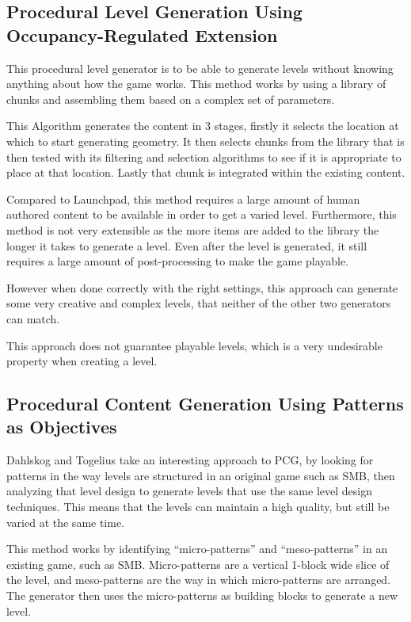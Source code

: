 \documentclass{scrartcl}
\begin{document}
\subsection{Procedural Level Generation Using Occupancy-Regulated Extension}

This procedural level generator is to be able to generate levels without knowing anything about how the game works. This method works by using a library of chunks and assembling them based on a complex set of parameters. 

This Algorithm generates the content in 3 stages, firstly it selects the location at which to start generating geometry. It then selects chunks from the library that is then tested with its filtering and selection algorithms to see if it is appropriate to place at that location. Lastly that chunk is integrated within the existing content.

Compared to Launchpad, this method requires a large amount of human authored content to be available in order to get a varied level. Furthermore, this method is not very extensible as the more items are added to the library the longer it takes to generate a level. Even after the level is generated, it still requires a large amount of post-processing to make the game playable.

However when done correctly with the right settings, this approach can generate some very creative and complex levels, that neither of the other two generators can match.

This approach does not guarantee playable levels, which is a very undesirable property when creating a level.



\subsection{Procedural Content Generation Using Patterns as Objectives}

Dahlskog and Togelius take an interesting approach to PCG, by looking for patterns in the way levels are structured in an original game such as SMB, then analyzing that level design to generate levels that use the same level design techniques. This means that the levels can maintain a high quality, but still be varied at the same time.

This method works by identifying ``micro-patterns'' and ``meso-patterns'' in an existing game, such as SMB. Micro-patterns are a vertical 1-block wide slice of the level, and meso-patterns are the way in which micro-patterns are arranged. The generator then uses the micro-patterns as building blocks to generate a new level.
\end{document}
